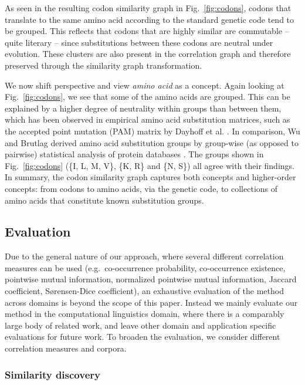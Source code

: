 \documentclass{kais}
\begin{document}
As seen in the resulting codon similarity graph in Fig.\ \ref{fig:codons}, codons that translate to the same amino acid according
to the standard genetic code \cite{Nirenberg65} tend to be grouped. This reflects that codons that are highly similar
are commutable -- quite literary -- since substitutions between these codons are neutral under evolution. These clusters are also
present in the correlation graph and therefore preserved through the similarity graph transformation.

We now shift perspective and view \emph{amino acid} as a concept. Again looking at Fig.\ \ref{fig:codons},
we see that some of the amino acids are grouped. This can be explained by a higher degree of neutrality within groups
than between them, which has been observed in empirical amino acid substitution matrices, such as the accepted point
mutation (PAM) matrix by Dayhoff et al. \cite{Dayhoff78}. In comparison, Wu and Brutlag derived amino acid substitution
groups by group-wise (as opposed to pairwise) statistical analysis of protein databases \cite{Wu96}.  The groups shown
in Fig.\ \ref{fig:codons} (\{I, L, M, V\}, \{K, R\} and \{N, S\}) all agree with their findings. In summary, the codon similarity 
graph captures both concepts and higher-order concepts: from codons to amino acids, via the genetic code,
to collections of amino acids that constitute known substitution groups.

\subsection{Evaluation}
\label{subsec: evaluation}

Due to the general nature of our approach, where several different correlation measures can be used 
(e.g.\ co-occurrence probability, co-occurrence existence, pointwise mutual information, normalized pointwise 
mutual information, Jaccard coefficient, S{\o}rensen-Dice coefficient), an exhaustive evaluation of the
method across domains is beyond the scope of this paper. Instead we mainly evaluate our method in
the computational linguistics domain, where there is a comparably large body of related work, 
and leave other domain and application specific evaluations for future work. 
To broaden the evaluation, we consider different correlation measures and corpora.

\subsubsection{Similarity discovery}
\label{subsubsec: similarity-discovery}
\end{document}
